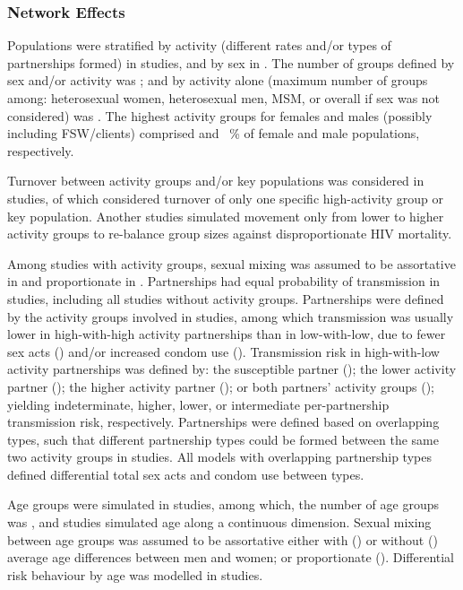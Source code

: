 \subsubsection{Network Effects}
\label{sss:res:network}
Populations were stratified by activity (different rates and/or types of partnerships formed)
in  studies, and by sex in .
The number of groups defined by sex and/or activity was ;
and by activity alone (maximum number of groups among:
heterosexual women, heterosexual men, MSM, or overall if sex was not considered) was .
The highest activity groups for females and males (possibly including FSW/clients) comprised
 and ~\% of female and male populations, respectively.
\par
Turnover between activity groups and/or key populations
was considered in  studies,
of which  considered turnover of only
one specific high-activity group or key population.
Another  studies simulated
movement only from lower to higher activity groups
to re-balance group sizes against disproportionate HIV mortality.
\par
Among  studies with activity groups, sexual mixing was assumed to be
assortative in  and proportionate in .
Partnerships had equal probability of transmission in  studies,
including all studies without activity groups.
Partnerships were defined by the activity groups involved in  studies,
among which transmission was usually
lower in high-with-high activity partnerships than in low-with-low, due to
fewer sex acts () and/or increased condom use ().
Transmission risk in high-with-low activity partnerships was defined by:
the susceptible partner ();
the lower activity partner ();
the higher activity partner (); or
both partners' activity groups ();
yielding indeterminate, higher, lower, or intermediate
per-partnership transmission risk, respectively.
Partnerships were defined based on overlapping types, such that
different partnership types could be formed between the same two activity groups in  studies.
All models with overlapping partnership types defined differential total sex acts and condom use between types.
\par
Age groups were simulated in  studies, among which,
the number of age groups was ,
and  studies simulated age along a continuous dimension.
Sexual mixing between age groups was assumed to be assortative
either with () or without ()
average age differences between men and women;
or proportionate ().
Differential risk behaviour by age was modelled in  studies.
